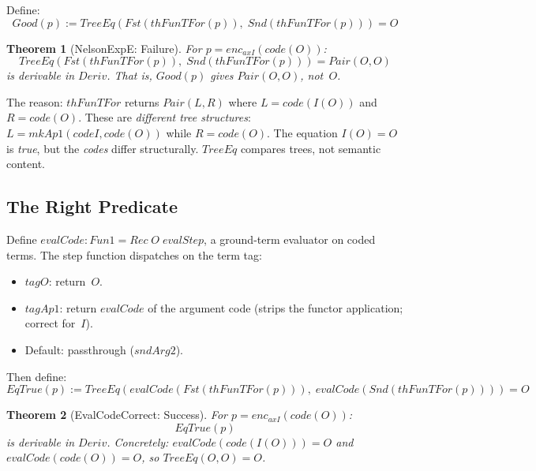 \documentclass[11pt]{article}
\newtheorem{theorem}{Theorem}
\begin{document}
Define:
\[
  \mathit{Good}(p) := \mathit{TreeEq}(\mathit{Fst}(\mathit{thFunTFor}(p)),\;
  \mathit{Snd}(\mathit{thFunTFor}(p))) = O
\]

\begin{theorem}[NelsonExpE: Failure]
For $p = \mathit{enc}_{\mathit{axI}}(\mathit{code}(O))$:
\[
  \mathit{TreeEq}(\mathit{Fst}(\mathit{thFunTFor}(p)),\;
  \mathit{Snd}(\mathit{thFunTFor}(p))) = \mathit{Pair}(O,O)
\]
is derivable in $\mathit{Deriv}$. That is, $\mathit{Good}(p)$
gives $\mathit{Pair}(O,O)$, not~$O$.
\end{theorem}

The reason: $\mathit{thFunTFor}$ returns $\mathit{Pair}(L,R)$
where $L = \mathit{code}(I(O))$ and $R = \mathit{code}(O)$. These
are \emph{different tree structures}: $L = \mathit{mkAp1}(\mathit{codeI},
\mathit{code}(O))$ while $R = \mathit{code}(O)$. The equation
$I(O) = O$ is \emph{true}, but the \emph{codes} differ structurally.
$\mathit{TreeEq}$ compares trees, not semantic content.

\subsection{The Right Predicate}

Define $\mathit{evalCode} : \mathit{Fun1} = \mathit{Rec}\;O\;
\mathit{evalStep}$, a ground-term evaluator on coded terms.
The step function dispatches on the term tag:
\begin{itemize}
\item $\mathit{tagO}$: return~$O$.
\item $\mathit{tagAp1}$: return $\mathit{evalCode}$ of the argument
  code (strips the functor application; correct for~$I$).
\item Default: passthrough ($\mathit{sndArg2}$).
\end{itemize}

Then define:
\[
  \mathit{EqTrue}(p) := \mathit{TreeEq}(\mathit{evalCode}(
  \mathit{Fst}(\mathit{thFunTFor}(p))),\;
  \mathit{evalCode}(\mathit{Snd}(\mathit{thFunTFor}(p)))) = O
\]

\begin{theorem}[EvalCodeCorrect: Success]
\label{thm:eqtrue}
For $p = \mathit{enc}_{\mathit{axI}}(\mathit{code}(O))$:
\[
  \mathit{EqTrue}(p)
\]
is derivable in $\mathit{Deriv}$. Concretely:
$\mathit{evalCode}(\mathit{code}(I(O))) = O$ and
$\mathit{evalCode}(\mathit{code}(O)) = O$,
so $\mathit{TreeEq}(O, O) = O$.
\end{theorem}
\end{document}

